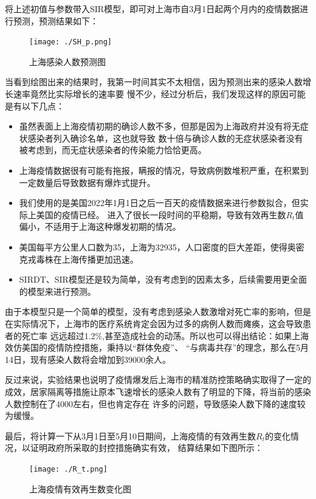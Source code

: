 \documentclass[bwprint]{gmcmthesis}
\numberwithin{figure}{section}
\begin{document}
\par 将上述初值与参数带入SIR模型，即可对上海市自3月1日起两个月内的疫情数据进行预测，预测结果如下：

\begin{figure}[!h]
    \centering
    \texttt{[image: ./SH\_p.png]}
    \caption{上海感染人数预测图}
    \label{fig1}
\end{figure}

\par 当看到绘图出来的结果时，我第一时间其实不太相信，因为预测出来的感染人数增长速率竟然比实际增长的速率要
慢不少，经过分析后，我们发现这样的原因可能是有以下几点：
\begin{itemize}
    \item 虽然表面上上海疫情初期的确诊人数不多，但那是因为上海政府并没有将无症状感染者列入确诊名单，这也就导致
数十倍与确诊人数的无症状感染者没有被考虑到，而无症状感染者的传染能力恰恰更高。
    \item 上海疫情数据很有可能有拖报，瞒报的情况，导致病例数堆积严重，在积累到一定数量后导致数据有爆炸式提升。
    \item 我们使用的是美国2022年1月1日之后一百天的疫情数据来进行参数拟合，但实际上美国的疫情已经。
进入了很长一段时间的平稳期，导致有效再生数$R_t$值偏小，不适用于上海这种爆发初期的情况。
    \item 美国每平方公里人口数为35，上海为32935，人口密度的巨大差距，使得奥密克戎毒株在上海传播更加迅速。
    \item SIRDT、SIR模型还是较为简单，没有考虑到的因素太多，后续需要用更全面的模型来进行预测。
\end{itemize}

\par 由于本模型只是一个简单的模型，没有考虑到感染人数激增对死亡率的影响，但是在实际情况下，上海市的医疗系统肯定会因为过多的病例人数而瘫痪，这会导致患者的死亡率
远远超过1.2$\%$,甚至造成社会的动荡。所以也可以得出结论：如果上海效仿美国的疫情防控措施，秉持以“群体免疫”、
“与病毒共存”的理念，那么在5月14日，现有感染人数将会增加到39000余人。
\par 反过来说，实验结果也说明了疫情爆发后上海市的精准防控策略确实取得了一定的成效，居家隔离等措施让原本飞速增长的感染人数有了明显的下降，将当前的感染人数控制在了4000左右，但也肯定存在
许多的问题，导致感染人数下降的速度较为缓慢。

\par 最后，将计算一下从3月1日至5月10日期间，上海疫情的有效再生数$R_t$的变化情况，以证明政府所采取的封控措施确实有效，
结算结果如下图所示：

\begin{figure}[!h]
    \centering
    \texttt{[image: ./R\_t.png]}
    \caption{上海疫情有效再生数变化图}
    \label{fig1}
\end{figure}
\end{document}
